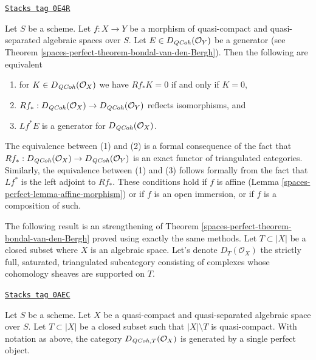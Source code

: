 \begin{remark}
\label{spaces-perfect-remark-pullback-generator}
\href{https://stacks.math.columbia.edu/tag/0E4R}{\texttt{Stacks tag 0E4R}}

Let $S$ be a scheme.
Let $f : X \to Y$ be a morphism of quasi-compact and quasi-separated
algebraic spaces over $S$.
Let $E \in D_{\mathit{QCoh}}(\mathcal{O}_Y)$ be a generator
(see Theorem \ref{spaces-perfect-theorem-bondal-van-den-Bergh}).
Then the following are equivalent
\begin{enumerate}
\item for $K \in D_{\mathit{QCoh}}(\mathcal{O}_X)$ we have
$Rf_*K = 0$ if and only if $K = 0$,
\item $Rf_* : D_{\mathit{QCoh}}(\mathcal{O}_X) \to D_{\mathit{QCoh}}(\mathcal{O}_Y)$
reflects isomorphisms, and
\item $Lf^*E$ is a generator for $D_{\mathit{QCoh}}(\mathcal{O}_X)$.
\end{enumerate}
The equivalence between (1) and (2) is a formal consequence of the fact that
$Rf_* : D_{\mathit{QCoh}}(\mathcal{O}_X) \to D_{\mathit{QCoh}}(\mathcal{O}_Y)$ is an
exact functor of triangulated categories. Similarly, the equivalence
between (1) and (3) follows formally from the fact that $Lf^*$
is the left adjoint to $Rf_*$.
These conditions hold if $f$ is affine (Lemma \ref{spaces-perfect-lemma-affine-morphism})
or if $f$ is an open immersion, or if $f$ is a composition of such.
\end{remark}

The following result is an strengthening of
Theorem \ref{spaces-perfect-theorem-bondal-van-den-Bergh}
proved using exactly the same methods.
Let $T \subset |X|$ be a closed subset where $X$ is an algebraic space.
Let's denote $D_T(\mathcal{O}_X)$ the strictly full, saturated,
triangulated subcategory consisting of complexes whose
cohomology sheaves are supported on $T$.

\begin{lemma}
\label{spaces-perfect-lemma-generator-with-support}
\href{https://stacks.math.columbia.edu/tag/0AEC}{\texttt{Stacks tag 0AEC}}

Let $S$ be a scheme. Let $X$ be a quasi-compact and quasi-separated
algebraic space over $S$. Let $T \subset |X|$ be a
closed subset such that $|X| \setminus T$ is quasi-compact. With notation
as above, the category $D_{\mathit{QCoh}, T}(\mathcal{O}_X)$ is generated by a
single perfect object.
\end{lemma}

